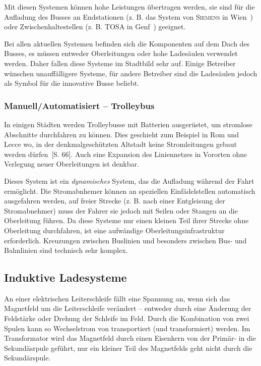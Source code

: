 Mit diesen Systemen können hohe Leistungen übertragen werden, sie sind für die Aufladung des Busses an Endstationen (z. B. das System von \textsc{Siemens} in Wien~\cite{SiemensWien}) oder Zwischenhaltestellen (z. B. \textsc{TOSA} in Genf~\cite{tosa}) geeignet. 

Bei allen aktuellen Systemen befinden sich die Komponenten auf dem Dach des Busses, es müssen entweder Oberleitungen oder hohe Ladesäulen verwendet werden. Daher fallen diese Systeme im Stadtbild sehr auf. Einige Betreiber wünschen unauffälligere Systeme, für andere Betreiber sind die Ladesäulen jedoch als Symbol für die innovative Busse beliebt.

\subsubsection{Manuell/Automatisiert – Trolleybus}
In einigen Städten werden Trolleybusse mit Batterien ausgerüstet, um stromlose Abschnitte durchfahren zu können. Dies geschieht zum Beispiel in Rom und Lecce wo, in der denkmalgeschützten Altstadt keine Stromleitungen gebaut werden dürfen~\cite{tub_aleph001746639}[S. 66]. Auch eine Expansion des Liniennetzes in Vororten ohne Verlegung neuer Oberleitungen ist denkbar.

Dieses System ist ein \emph{dynamisches} System, das die Aufladung während der Fahrt ermöglicht. Die Stromabnhemer können an speziellen Einfädelstellen automatisch ausgefahren werden, auf freier Strecke (z. B. nach einer Entgleisung der Stromabnehmer) muss der Fahrer sie jedoch mit Seilen oder Stangen an die Oberleitung führen. Da diese Systeme nur einen kleinen Teil ihrer Strecke ohne Oberleitung durchfahren, ist eine aufwändige Oberleitungsinfrastruktur erforderlich. Kreuzungen zwischen Buslinien und besonders zwischen Bus- und Bahnlinien sind technisch sehr komplex.
                                 
\subsection{Induktive Ladesysteme}
An einer elektrischen Leiterschleife fällt eine Spannung an, wenn sich das Magnetfeld um die Leiterschleife verändert – entweder durch eine Änderung der Feldstärke oder Drehung der Schleife im Feld. Durch die Kombination von zwei Spulen kann so Wechselstrom von transportiert (und transformiert) werden. Im Transformator wird das Magnetfeld durch einen Eisenkern von der Primär- in die Sekundäsrpule geführt, nur ein kleiner Teil des Magnetfelds geht nicht durch die Sekundärspule.

